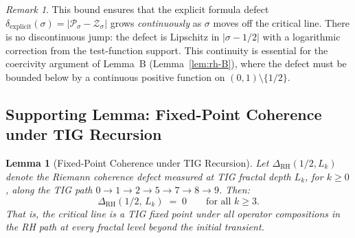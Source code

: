 \documentclass[11pt]{article}
\newtheorem{lemma}[theorem]{Lemma}
\theoremstyle{remark}
\newtheorem{remark}[theorem]{Remark}
\begin{document}
\begin{remark}
This bound ensures that the explicit formula defect
$\delta_{\mathrm{explicit}}(\sigma) = |\mathcal{P}_\sigma - \mathcal{Z}_\sigma|$
grows \emph{continuously} as $\sigma$ moves off the critical line.
There is no discontinuous jump: the defect is Lipschitz in $|\sigma - 1/2|$
with a logarithmic correction from the test-function support.
This continuity is essential for the coercivity argument of Lemma~B
(Lemma~\ref{lem:rh-B}), where the defect must be bounded below by a continuous
positive function on $(0,1)\setminus\{1/2\}$.
\end{remark}

\subsection{Supporting Lemma: Fixed-Point Coherence under TIG Recursion}
\label{subsec:tig-fixed-point}

\begin{lemma}[Fixed-Point Coherence under TIG Recursion]
\label{lem:tig-fixed-point}
Let $\Delta_{\mathrm{RH}}(1/2, L_k)$ denote the Riemann coherence defect
measured at TIG fractal depth $L_k$, for $k \geq 0$, along the TIG path
$0 \to 1 \to 2 \to 5 \to 7 \to 8 \to 9$.
Then:
\begin{equation}\label{eq:tig-fixed-point}
  \Delta_{\mathrm{RH}}(1/2,\, L_k) \;=\; 0
  \qquad \text{for all } k \geq 3.
\end{equation}
That is, the critical line is a TIG fixed point under all operator compositions
in the RH path at every fractal level beyond the initial transient.
\end{lemma}
\end{document}
